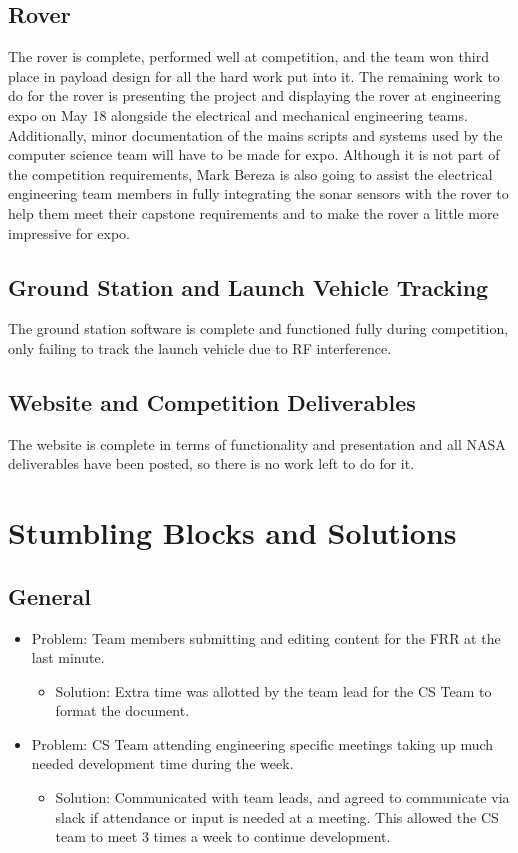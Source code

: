 \documentclass[onecolumn, draftclsnofoot, 10pt, compsoc]{IEEEtran}
\begin{document}
\subsection{Rover}
The rover is complete, performed well at competition, and the team won third place in payload design for all the hard work put into it. The remaining work to do for the rover is presenting the project and displaying the rover at engineering expo on May 18 alongside the electrical and mechanical engineering teams. Additionally, minor documentation of the mains scripts and systems used by the computer science team will have to be made for expo. Although it is not part of the competition requirements, Mark Bereza is also going to assist the electrical engineering team members in fully integrating the sonar sensors with the rover to help them meet their capstone requirements and to make the rover a little more impressive for expo.

\subsection{Ground Station and Launch Vehicle Tracking}
The ground station software is complete and functioned fully during competition, only failing to track the launch vehicle due to RF interference.

\subsection{Website and Competition Deliverables}
The website is complete in terms of functionality and presentation and all NASA deliverables have been posted, so there is no work left to do for it.

\section{Stumbling Blocks and Solutions}
\subsection{General}
\begin{itemize}
\item Problem: Team members submitting and editing content for the FRR at the last minute.
\begin{itemize}
\item Solution: Extra time was allotted by the team lead for the CS Team to format the document. 
\end{itemize}
\item Problem: CS Team attending engineering specific meetings taking up much needed development time during the week.
\begin{itemize}
\item Solution: Communicated with team leads, and agreed to communicate via slack if attendance or input is needed at a meeting. This allowed the CS team to meet 3 times a week to continue development.
\end{itemize}
\end{itemize}
\end{document}
